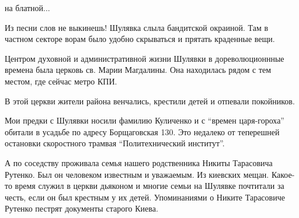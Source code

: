 на блатной...

Из песни слов не выкинешь! Шулявка слыла бандитской окраиной. Там в частном
секторе ворам было удобно скрываться и прятать краденные вещи.


Центром духовной и административной жизни Шулявки в дореволюционнные времена
была церковь св. Марии Магдалины. Она находилась рядом с тем местом, где сейчас
метро КПИ.

В этой церкви жители района венчались, крестили детей и отпевали покойников.

\raggedcolumns
\begin{multicols}{3} %
\setlength{\parindent}{0pt}








\end{multicols} %


Мои предки с Шулявки носили фамилию Куличенко и с \enquote{времен царя-гороха} обитали
в усадьбе по адресу Борщаговская 130. Это недалеко от теперешней остановки
скоростного трамвая \enquote{Политехнический институт}.

А по соседству проживала семья нашего родственника Никиты Тарасовича Рутенко.
Был он человеком известным и уважаемым. Из киевских мещан. Какое-то время
служил в церкви дьяконом и многие семьи на Шулявке почтитали за честь, если он
был крестным у их детей. Упоминаниями о Никите Тарасовиче Рутенко пестрят
документы старого Киева.

